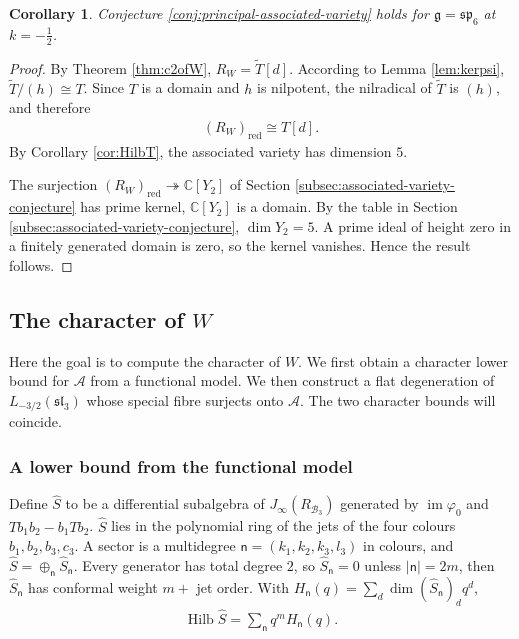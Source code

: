 \documentclass[11pt]{amsart}
\newtheorem{corollary}[theorem]{Corollary}
\theoremstyle{definition}
\theoremstyle{remark}
\newcommand{\C}{\mathbb C}
\newcommand{\g}{\mathfrak g}
\newcommand{\B}{\mathcal B}
\newcommand{\red}{\mathrm{red}}
\begin{document}
\begin{corollary}
Conjecture \ref{conj:principal-associated-variety} holds for $\g=\mathfrak{sp}_6$ at $k=-\frac12$.
\end{corollary}
\begin{proof}
By Theorem	\ref{thm:c2ofW}, $R_{W}=\tilde{T}[d].$ According to Lemma \ref{lem:kerpsi}, $\tilde{T}/(h)\cong T$. Since $T$ is a domain and $h$ is nilpotent, the nilradical of $\tilde{T}$ is $(h)$, and therefore
\begin{align*}
(R_W)_{\red}\cong T[d].	
\end{align*}
By Corollary \ref{cor:HilbT}, the associated variety has dimension $5$. 

The surjection $(R_W)_{\red}\twoheadrightarrow \C[Y_2]$ of Section \ref{subsec:associated-variety-conjecture} has prime kernel, $\C[Y_2]$ is a domain. By the table in Section \ref{subsec:associated-variety-conjecture}, $\dim Y_2=5$. A prime ideal of height zero in a finitely generated domain is zero, so the kernel vanishes. Hence the result follows. 
\end{proof}
\subsection{The character of $W$}
Here the goal is to compute the character of $W$.
We first obtain a character lower bound for $\mathcal{A}$ from a functional model. We then construct a flat degeneration of $L_{-3/2}(\mathfrak{sl}_3)$ whose special fibre surjects onto $\mathcal{A}$. The two character bounds will coincide. 
\subsubsection{A lower bound from the functional model}
Define $\widehat{S}$ to be a differential subalgebra of $J_{\infty}(R_{\B_3})$ generated by $\operatorname{im}\varphi_0$ and $Tb_1b_2-b_1Tb_2$. $\widehat{S}$ lies in the polynomial ring of the jets of the four colours $b_1,b_2,b_3,c_3$. A sector is a multidegree $\mathsf n=(k_1,k_2,k_3,l_3)$ in colours, and $\widehat{S}=\oplus_{\mathsf n} \widehat{S}_{\mathsf n}.$ Every generator has total degree $2$, so $\widehat{S}_{\mathsf n}=0$ unless $|\mathsf n|=2m$, then $\widehat{S}_{\mathsf n}$ has conformal weight $m+$ jet order. With $H_{\mathsf n}(q)=\sum_d\dim(\widehat{S}_{\mathsf n})_d q^d$, 
\begin{align*}
\operatorname{Hilb}\widehat{S}=\sum_{\mathsf n}q^m H_{\mathsf n}(q).	
\end{align*}
\end{document}
